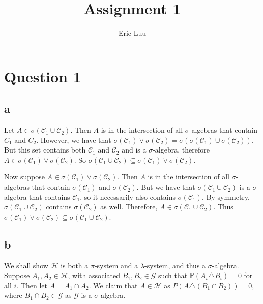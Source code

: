 \documentclass{article}
\title{Assignment 1}
\author{Eric Luu}
\theoremstyle{definition}
\numberwithin{theorem}{section}
\numberwithin{equation}{section}
\begin{document}
\maketitle
\section{Question 1}
\subsection{a}
Let $A \in \sigma(\mathcal{C}_1 \cup \mathcal{C}_2)$. Then $A$ is in the intersection of all $\sigma$-algebras that contain $C_1$ and $C_2$. However, we have that $\sigma(\mathcal{C}_1) \vee \sigma(\mathcal{C}_2) = \sigma(\sigma(\mathcal{C}_1) \cup \sigma(\mathcal{C}_2))$. But this set contains both $\mathcal{C}_1$ and $\mathcal{C}_2$ and is a $\sigma$-algebra, therefore $A \in \sigma(\mathcal{C}_1) \vee \sigma(\mathcal{C}_2)$. So $ \sigma(\mathcal{C}_1 \cup \mathcal{C}_2) \subseteq \sigma(\mathcal{C}_1) \vee \sigma(\mathcal{C}_2)$.

Now suppose $A \in \sigma(\mathcal{C}_1) \vee \sigma(\mathcal{C}_2)$. Then $A$ is in the intersection of all $\sigma$-algebras that contain $\sigma(\mathcal{C}_1)$ and $\sigma(\mathcal{C}_2)$. But we have that $\sigma(\mathcal{C}_1 \cup \mathcal{C}_2)$ is a $\sigma$-algebra that contains $\mathcal{C}_1$, so it necessarily also contains $\sigma(\mathcal{C}_1)$. By symmetry, $\sigma(\mathcal{C}_1 \cup \mathcal{C}_2)$ contains $\sigma(\mathcal{C}_2)$ as well. Therefore, $A \in \sigma(\mathcal{C}_1 \cup \mathcal{C}_2)$. Thus $\sigma(\mathcal{C}_1) \vee \sigma(\mathcal{C}_2) \subseteq \sigma(\mathcal{C}_1 \cup \mathcal{C}_2)$. 

\subsection{b}
We shall show $\mathcal{H}$ is both a $\pi$-system and a $\lambda$-system, and thus a $\sigma$-algebra. Suppose $A_1, A_2 \in \mathcal{H}$, with associated $B_1, B_2 \in \mathcal{G}$ such that $\mathbb{P}(A_i \triangle B_i) = 0$ for all $i$. 
Then let $A = A_1 \cap A_2$. We claim that $A \in \mathcal{H}$ as $P(A \triangle (B_1 \cap B_2)) = 0$, where $B_1 \cap B_2 \in \mathcal{G}$ as $\mathcal{G}$ is a $\sigma$-algebra.
\end{document}

